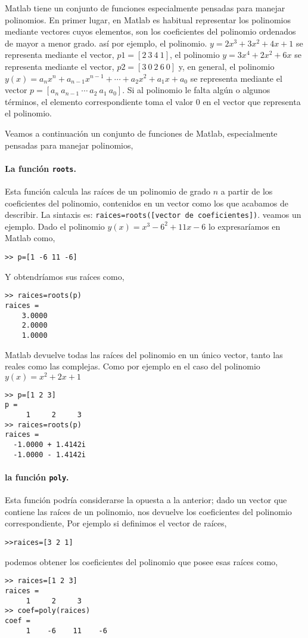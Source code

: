 Matlab tiene un conjunto de funciones especialmente pensadas para  manejar polinomios. En primer lugar, en Matlab es habitual representar los polinomios mediante vectores cuyos elementos, son los coeficientes del polinomio ordenados de mayor a menor grado. así por ejemplo, el polinomio. $y=2x^3+3x^2+4x+1$ se representa mediante el vector, $p1=[2\ 3\ 4\ 1]$,  el polinomio $y=3x^4+2x^2+6x$ se representa mediante el vector,  $p2=[3\ 0\ 2\ 6\ 0]$ y, en general, el polinomio $y(x)=a_nx^n+a_{n-1}x^{n-1}+\cdots+a_2x^2+a_1x+a_0$  se representa mediante el vector $p=[a_n\ a_{n-1}\ \cdots\ a_2\ a_1\ a_0]$. Si al polinomio le falta algún o algunos términos, el elemento correspondiente toma el valor $0$ en el vector que representa el polinomio.

Veamos a continuación un conjunto de funciones de Matlab, especialmente pensadas para manejar polinomios,

\paragraph{La función \texttt{roots}.} Esta función calcula las raíces de un polinomio de grado $n$ a partir de los coeficientes del polinomio, contenidos en un vector como los que acabamos de describir. La sintaxis es: \texttt{raices=roots([vector de coeficientes])}. veamos un ejemplo. Dado el polinomio $y(x)=x^3-6^2+11x-6$ lo expresaríamos en Matlab como,

\begin{verbatim}
>> p=[1 -6 11 -6]
\end{verbatim}

Y obtendríamos sus raíces como,

\begin{verbatim}
>> raices=roots(p)
raices =
    3.0000
    2.0000
    1.0000

\end{verbatim}

Matlab devuelve todas las raíces del polinomio en un único vector, tanto las reales como las complejas. Como por ejemplo en el caso del polinomio $y(x)=x^2+2x+1$

\begin{verbatim}
>> p=[1 2 3]
p =
     1     2     3
>> raices=roots(p)
raices =
  -1.0000 + 1.4142i
  -1.0000 - 1.4142i
\end{verbatim}

\paragraph{la función \texttt{poly}.} Esta función podría considerarse la opuesta a la anterior; dado un vector que contiene las raíces de un polinomio, nos devuelve los coeficientes del polinomio correspondiente, Por ejemplo si definimos el vector de raíces, 
\begin{verbatim}
>>raices=[3 2 1]
\end{verbatim}
podemos obtener los coeficientes del polinomio que posee esas raíces como,
\begin{verbatim}
>> raices=[1 2 3]
raices =
     1     2     3
>> coef=poly(raices)
coef =
     1    -6    11    -6
\end{verbatim}

